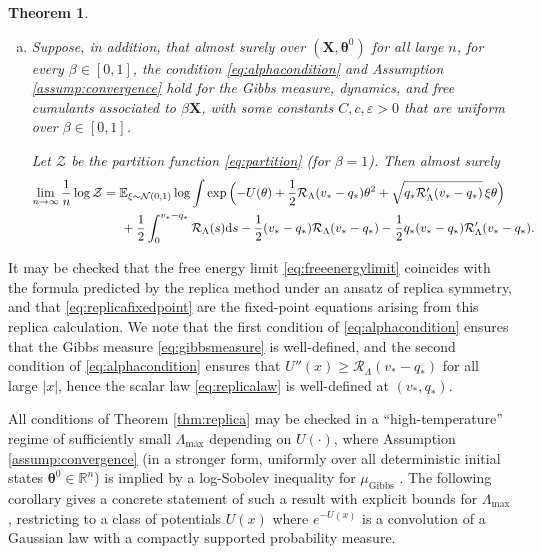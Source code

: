 \documentclass[11pt,letterpaper,reqno]{amsart}
\def\eps{\varepsilon}
\def\E{\mathbb{E}}
\def\R{\mathbb{R}}
\def\d{\mathrm{d}}
\def\btheta{\boldsymbol{\theta}}
\def\X{\mathbf{X}}
\def\cR{\mathcal{R}}
\def\cN{\mathcal{N}}
\def\cZ{\mathcal{Z}}
\def\Gibbs{\mathrm{Gibbs}}
\newtheorem{theorem}{Theorem}[section]
\theoremstyle{definition}
\numberwithin{equation}{section}
\begin{document}
\begin{theorem}
\begin{enumerate}[(a)]
For any function $f:\R \to \R$ satisfying
$|f(x)-f(y)| \leq C(1+|x|+|y|)|x-y|$ for some $C>0$, almost surely
\begin{equation}\label{eq:pseudoliptest}
\lim_{n \to \infty} \frac{1}{n}\sum_{i=1}^n \langle f(\theta_i) \rangle
=\E_{\xi \sim \cN(0,1)} \langle f(\theta) \rangle_{v_*,q_*,\xi}.
\end{equation}
\item Suppose, in addition, that almost surely over $(\X,\btheta^0)$ for all
large $n$, for every $\beta \in [0,1]$,
the condition \eqref{eq:alphacondition} and Assumption
\ref{assump:convergence} hold for the Gibbs measure, dynamics, and free
cumulants associated to $\beta \X$, with some constants $C,c,\eps>0$
that are uniform over $\beta \in [0,1]$.

Let $\cZ$ be
the partition function \eqref{eq:partition} (for $\beta=1$). Then almost surely
\begin{align}
\lim_{n \to \infty} \frac{1}{n}\log \cZ
&=\E_{\xi \sim \cN(0,1)} \log \int \exp\Big({-}U(\theta)
+\frac{1}{2}\cR_\Lambda(v_*-q_*)\theta^2+\sqrt{q_*\cR_\Lambda'(v_*-q_*)}\,\xi\theta\Big)\notag\\
&\hspace{0.2in}+\frac{1}{2}\int_0^{v_*-q_*} \cR_\Lambda(s)\d s
-\frac{1}{2}(v_*-q_*)\cR_\Lambda(v_*-q_*)-\frac{1}{2}q_*(v_*-q_*)\cR_\Lambda'(v_*-q_*).\label{eq:freeenergylimit}
\end{align}
\end{enumerate}
\end{theorem}

It may be checked that the free energy limit \eqref{eq:freeenergylimit} coincides with the formula predicted by the replica method under an ansatz of replica symmetry, and that \eqref{eq:replicafixedpoint} are the fixed-point equations arising from this replica calculation. We note that the first condition of \eqref{eq:alphacondition} ensures that the Gibbs measure \eqref{eq:gibbsmeasure} is well-defined, and the second condition of \eqref{eq:alphacondition} ensures that $U''(x) \geq \cR_\Lambda(v_*-q_*)$ for all large $|x|$, hence the scalar law \eqref{eq:replicalaw} is well-defined at $(v_*,q_*)$.

All conditions of Theorem \ref{thm:replica} may be checked in a
``high-temperature'' regime of sufficiently small $\Lambda_{\max}$ depending on
$U(\cdot)$, where Assumption \ref{assump:convergence} (in a stronger form,
uniformly over all deterministic initial states $\btheta^0 \in \R^n$) is
implied by a log-Sobolev inequality for $\mu_\Gibbs$
\cite{bauerschmidt2019very}. The following corollary gives a concrete
statement of such a result with explicit bounds for $\Lambda_{\max}$,
restricting to a class of potentials $U(x)$ where $e^{-U(x)}$
is a convolution of a Gaussian law with a compactly supported probability
measure.
\end{document}
